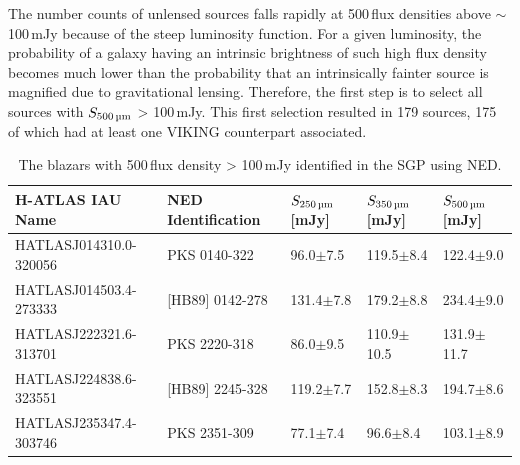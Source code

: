 The number counts of unlensed sources falls rapidly at 500\,\micron flux densities above $\sim$ 100\,mJy because of the steep luminosity function. For a given luminosity, the probability of a galaxy having an intrinsic brightness of such high flux density becomes much lower than the probability that an intrinsically fainter source is magnified due to gravitational lensing. Therefore, the first step is to select all sources with $S_{\textrm{500\,\micron}}$ > 100\,mJy. This first selection resulted in 179 sources, 175 of which had at least one VIKING counterpart associated. 

\begin{table}
    \centering
    \begin{tabular}{|p{5cm}|p{3.5cm}|p{2.5cm}|p{2.5cm}|p{2.5cm}|}
        \hline
        H-ATLAS IAU Name & NED Identification & $S_{\textrm{250\,\micron}}$ [mJy] & $S_{\textrm{350\,\micron}}$ [mJy] & $S_{\textrm{500\,\micron}}$ [mJy] \\
        \hline
        \hline
        HATLASJ014310.0-320056 & PKS 0140-322 & 96.0$\pm$7.5 & 119.5$\pm$8.4 & 122.4$\pm$9.0 \\
        HATLASJ014503.4-273333 & [HB89] 0142-278 & 131.4$\pm$7.8 & 179.2$\pm$8.8 & 234.4$\pm$9.0 \\
        HATLASJ222321.6-313701 & PKS 2220-318 & 86.0$\pm$9.5 & 110.9$\pm$10.5 & 131.9$\pm$11.7 \\
        HATLASJ224838.6-323551 & [HB89] 2245-328 & 119.2$\pm$7.7 & 152.8$\pm$8.3 & 194.7$\pm$8.6 \\
        HATLASJ235347.4-303746 & PKS 2351-309 & 77.1$\pm$7.4 & 96.6$\pm$8.4 & 103.1$\pm$8.9 \\
        \hline
    \end{tabular}
    \caption{The blazars with 500\,\micron flux density > 100\,mJy identified in the SGP using NED.}
    \label{tab:blazars}
\end{table}

